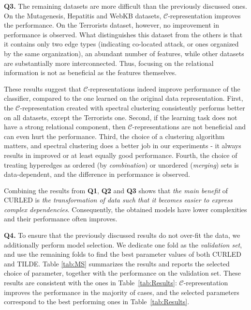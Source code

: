 \textbf{Q3.}
The remaining datasets are more difficult than the previously discussed ones.
On the Mutagenesis, Hepatitis and WebKB datasets, $\mathcal{C}$-representation improves the performance.
On the Terrorists dataset, however, no improvement in performance is observed.
What distinguishes this dataset from the others is that it contains only two edge types (indicating co-located attack, or ones organized by the same organization), an abundant number of features, while other datasets are substantially more interconnected.
Thus, focusing on the relational information is not as beneficial as the features themselves. 

These results suggest that $\mathcal{C}$-representations indeed improve performance of the classifier, compared to the one learned on the original data representation.
First, the $\mathcal{C}$-representation created with spectral clustering consistently performs better on all datasets, except the Terrorists one.
Second, if the learning  task does not have a strong relational component, then $\mathcal{C}$-representations are not beneficial and can even hurt the performance.
Third, the choice of a clustering algorithm matters, and spectral clustering does a better job in our experiments - it always results in improved or at least equally good performance.
Fourth, the choice of treating hyperedges as ordered (by \textit{combination}) or unordered (\textit{merging}) sets is data-dependent, and the difference in performance is observed.


Combining the results from \textbf{Q1}, \textbf{Q2} and \textbf{Q3} shows that \textit{the main benefit} of CURLED is \textit{the transformation of data such that it becomes easier to express complex dependencies}.
Consequently, the obtained models have lower complexities and  their performance often improves.


\textbf{Q4.} To ensure that the previously discussed results do not over-fit the data, we additionally perform model selection.
We dedicate one fold as the \textit{validation set}, and use the remaining folds to find the best parameter values of both CURLED and TILDE.
Table \ref{tab:MS} summarizes the results and reports the selected choice of parameter, together with the performance on the validation set.
These results are consistent with the ones in Table~\ref{tab:Results}: $\mathcal{C}$-representation improves the performance in the majority of cases, and the selected parameters correspond to the best performing ones in Table~\ref{tab:Results}.

